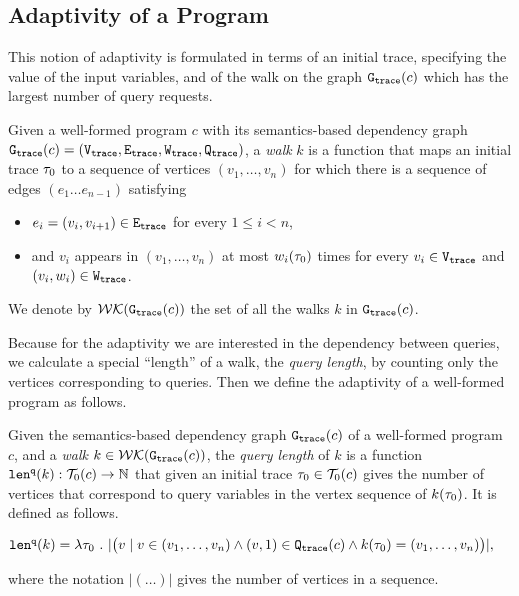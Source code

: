   \subsection{Adaptivity of a Program}
  \label{sec:sematnic_adaptivity}
 This notion of adaptivity is formulated in terms of an initial trace, specifying the value of the input variables, and of the walk on the graph $\mathtt{{G_{trace}}}({c})$ which has the largest number of query requests.
\begin{defn}[Walk]
\label{def:finitewalk}
Given a well-formed program $c$ with its semantics-based dependency graph $\mathtt{{G_{trace}}}({c}) = (\mathtt{{V_{trace}}}, \mathtt{{E_{trace}}}, \mathtt{{W_{trace}}}, \mathtt{{Q_{trace}}})$, a \emph{walk} $k$ is a function that maps an initial trace $\mathtt{\tau}_0$ to a sequence of vertices $(v_1, \ldots, v_{n})$
for which there is a sequence of edges $(e_1 \ldots e_{n - 1})$  satisfying
\begin{itemize}
\item $e_i = (v_{i},v_{i + 1}) \in \mathtt{{E_{trace}}}$ for every $1 \leq i < n$,
\item and $v_i$ appears in $(v_1, \ldots, v_{n})$ at most $w_i(\mathtt{\tau}_0)$ times for every $v_i \in \mathtt{{V_{trace}}}$ and $(v_i, w_i) \in \mathtt{{W_{trace}}}$.  
\end{itemize}
We denote by $\mathcal{WK}(\mathtt{{G_{trace}}}(c))$
the set of all the walks $k$ in $\mathtt{{G_{trace}}}(c)$.
\end{defn} 
Because for the adaptivity
we are interested in the dependency between queries,
we calculate a special ``length'' of a walk, the \emph{query length},  by counting only the vertices
corresponding to queries. Then we define the adaptivity of a well-formed program as follows.

\begin{defn}
\label{def:qlen}
Given 
the semantics-based dependency graph $\mathtt{{G_{trace}}}({c})$ of a well-formed program $c$,
 and a \emph{walk} 
 $k \in \mathcal{WK}(\mathtt{{G_{trace}}}(c))$, 
the \emph{query length} of $k$ is a function $\mathtt{len}^{\tt q}(k):\mathcal{T}_0(c) \to \mathbb{N}$ that 
given an initial trace $\mathtt{\tau}_0\in \mathcal{T}_0(c)$ 
gives
the number of vertices that correspond to query variables in the vertex sequence of $k(\mathtt{\tau}_0)$.
It is defined as follows.
\begin{center}
   $
  \mathtt{len}^{\tt q}(k) = \lambda \mathtt{\tau}_0 ~.~ |\big( v \mid v \in (v_1, \ldots, v_{n}) \land (v, 1) \in \mathtt{{Q_{trace}}}(c) 
  \land k(\mathtt{\tau}_0) = (v_1, \ldots, v_{n}) \big)|,
$
\end{center}
where the notation $| (\ldots) |$ gives the number of vertices in a sequence.
\end{defn}


